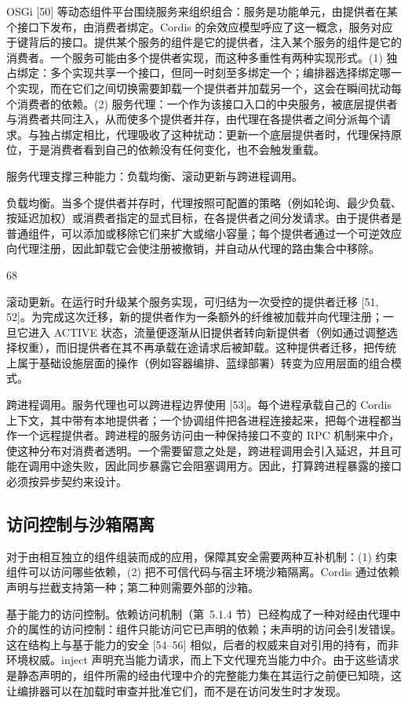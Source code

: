 \documentclass[
  10
]{article}
\begin{document}
OSGi {[}50{]} 等动态组件平台围绕服务来组织组合：服务是功能单元，由提供者在某个接口下发布，由消费者绑定。Cordis 的余效应模型呼应了这一概念，服务对应于键背后的接口。提供某个服务的组件是它的提供者，注入某个服务的组件是它的消费者。一个服务可能由多个提供者实现，而这种多重性有两种实现形式。(1) 独占绑定：多个实现共享一个接口，但同一时刻至多绑定一个；编排器选择绑定哪一个实现，而在它们之间切换需要卸载一个提供者并加载另一个，这会在瞬间扰动每个消费者的依赖。(2) 服务代理：一个作为该接口入口的中央服务，被底层提供者与消费者共同注入，从而使多个提供者并存，由代理在各提供者之间分派每个请求。与独占绑定相比，代理吸收了这种扰动：更新一个底层提供者时，代理保持原位，于是消费者看到自己的依赖没有任何变化，也不会触发重载。

服务代理支撑三种能力：负载均衡、滚动更新与跨进程调用。

负载均衡。当多个提供者并存时，代理按照可配置的策略（例如轮询、最少负载、按延迟加权）或消费者指定的显式目标，在各提供者之间分发请求。由于提供者是普通组件，可以添加或移除它们来扩大或缩小容量；每个提供者通过一个可逆效应向代理注册，因此卸载它会使注册被撤销，并自动从代理的路由集合中移除。

68

滚动更新。在运行时升级某个服务实现，可归结为一次受控的提供者迁移 {[}51, 52{]}。为完成这次迁移，新的提供者作为一条额外的纤维被加载并向代理注册；一旦它进入 ACTIVE 状态，流量便逐渐从旧提供者转向新提供者（例如通过调整选择权重），而旧提供者在其不再承载在途请求后被卸载。这种提供者迁移，把传统上属于基础设施层面的操作（例如容器编排、蓝绿部署）转变为应用层面的组合模式。

跨进程调用。服务代理也可以跨进程边界使用 {[}53{]}。每个进程承载自己的 Cordis 上下文，其中带有本地提供者；一个协调组件把各进程连接起来，把每个进程都当作一个远程提供者。跨进程的服务访问由一种保持接口不变的 RPC 机制来中介，使这种分布对消费者透明。一个需要留意之处是，跨进程调用会引入延迟，并且可能在调用中途失败，因此同步暴露它会阻塞调用方。因此，打算跨进程暴露的接口必须按异步契约来设计。

\subsection{访问控制与沙箱隔离} \label{access-control-and-sandboxing}

对于由相互独立的组件组装而成的应用，保障其安全需要两种互补机制：(1) 约束组件可以访问哪些依赖，(2) 把不可信代码与宿主环境沙箱隔离。Cordis 通过依赖声明与拦截支持第一种；第二种则需要外部的沙箱。

基于能力的访问控制。依赖访问机制（第~5.1.4 节）已经构成了一种对经由代理中介的属性的访问控制：组件只能访问它已声明的依赖；未声明的访问会引发错误。这在结构上与基于能力的安全 {[}54--56{]} 相似，后者的权威来自对引用的持有，而非环境权威。inject 声明充当能力请求，而上下文代理充当能力中介。由于这些请求是静态声明的，组件所需的经由代理中介的完整能力集在其运行之前便已知晓，这让编排器可以在加载时审查并批准它们，而不是在访问发生时才发现。
\end{document}
